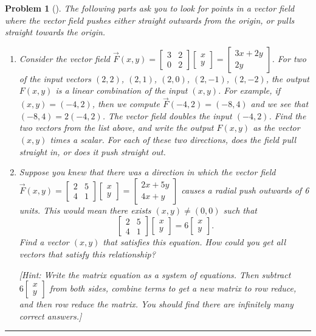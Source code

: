 \documentclass[letterpaper,oneside]{book}%
\theoremstyle{plain}
\theoremstyle{box}
\theoremstyle{problem}
\newtheorem{problemnum}{Problem}[chapter]
\newenvironment{problem}[1][]{\begin{problemnum}[#1]}{\end{problemnum}\nopagebreak\hrule\bigskip}
\newcommand{\bvec}[1]{\begin{bmatrix} #1 \end{bmatrix}}
\begin{document}
\begin{problem}
The following parts ask you to look for points in a vector field where the vector field pushes either straight outwards from the origin, or pulls straight towards the origin.
\begin{enumerate}
\item
Consider the vector field $\vec F(x,y) = \bvec{3&2\\0&2}\bvec{x\\y} = \bvec{3x+2y\\2y}$. 
For two of the input vectors $(2,2)$, $(2,1)$, $(2,0)$, $(2,-1)$, $(2,-2)$, the output $F(x,y)$ is a linear combination of the input $(x,y)$. For example, if $(x,y)=(-4,2)$, then we compute $\vec F(-4,2) = (-8, 4)$ and we see that $(-8,4) = 2(-4,2)$.  The vector field doubles the input $(-4,2)$. Find the two vectors from the list above, and write the output $F(x,y)$ as the vector $(x,y)$ times a scalar. For each of these two directions, does the field pull straight in, or does it push straight out. 
 \item Suppose you knew that there was a direction in which the vector field 
$\vec F(x,y) = \bvec{2&5\\4&1}\bvec{x\\y} = \bvec{2x+5y\\4x+y}$ causes a radial push outwards of 6 units. This would mean there exists $(x,y)\neq(0,0)$ such that 
$$\bvec{2&5\\4&1}\bvec{x\\y} = 6\bvec{x\\y}.$$
Find a vector $(x,y)$ that satisfies this equation. How could you get all vectors that satisfy this relationship?

[Hint: Write the matrix equation as a system of equations.  Then subtract  $6\bvec{x\\y}$ from both sides, combine terms to get a new matrix to row reduce, and then row reduce the matrix. You should find there are infinitely many correct answers.] 

\end{enumerate}


\end{problem}
\end{document}
